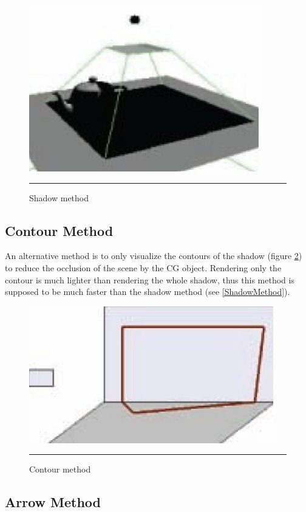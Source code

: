 \begin{figure}[htbp]
	\centering
	\includegraphics{./Primitives/theory_shadow.png}
	\rule{35em}{0.5pt}
	\caption[Shadow method]{Shadow method}
	\label{fig:ShadowMethod}
\end{figure}

\subsection{Contour Method}

An alternative method is to only visualize the contours of the shadow (figure \ref{fig:ContourMethod}) to reduce the occlusion of the scene by the CG object. Rendering only the contour is much lighter than rendering the whole shadow, thus this method is supposed to be much faster than the shadow method (see \ref{ShadowMethod}).

\begin{figure}[htbp]
	\centering
	\includegraphics{./Primitives/theory_contour.png}
	\rule{35em}{0.5pt}
	\caption[Contour method]{Contour method}
	\label{fig:ContourMethod}
\end{figure}

\subsection{Arrow Method}

